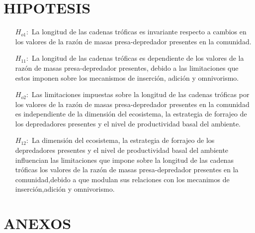 \documentclass [12pt]{article}
\numberwithin{equation}{section}
\begin{document}
\section{HIPOTESIS}
\begin{itemize}
\item[$H_{o1}:$] La longitud de las cadenas tr\'oficas es invariante respecto a cambios en los valores de la raz\'on de masas presa-depredador presentes en la comunidad.
\item[$H_{11}:$] La longitud de las cadenas tr\'oficas es dependiente de los valores de la raz\'on de masas presa-depredador presentes, debido a las limitaciones que estos imponen sobre los mecanismos de inserci\'on, adici\'on y omnivorismo.

\item[$H_{o2}:$] Las limitaciones impuestas sobre la longitud de las cadenas tr\'oficas por los  valores de la raz\'on de masas presa-depredador presentes en la comunidad es independiente de la dimensi\'on del ecosistema, la estrategia de forrajeo de los depredadores presentes y el nivel de productividad basal del ambiente.
\item[$H_{12}:$] La dimensi\'on del ecosistema, la estrategia de forrajeo de los depredadores presentes y el nivel de productividad basal del ambiente influencian las limitaciones que impone sobre la longitud de las cadenas tr\'oficas los valores de la raz\'on de masas presa-depredador presentes en la comunidad,debido a que modulan sus relaciones con los mecanimos de inserci\'on,adici\'on y omnivorismo.

\end{itemize}












\newpage
\section{ANEXOS}


\newpage
\end{document}
